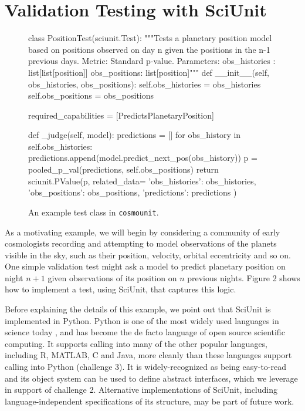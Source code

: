 \documentclass[9pt]{sig-alternate}
\begin{document}
\section{Validation Testing with {SciUnit}}
\begin{figure}[t]
\small
\begin{python}
class PositionTest(sciunit.Test):
    """Tests a planetary position model based on positions observed on day n given the positions in the n-1 previous days.
    Metric: Standard p-value.
    Parameters: 
      obs_histories : list[list[position]]
      obs_positions: list[position]"""
	def __init__(self, obs_histories, obs_positions):
		self.obs_histories = obs_histories
		self.obs_positions = obs_positions

	required_capabilities = [PredictsPlanetaryPosition]

	def _judge(self, model):
		predictions = []
		for obs_history in self.obs_histories:
			predictions.append(model.predict_next_pos(obs_history))
		p = pooled_p_val(predictions, self.obs_positions)
		return sciunit.PValue(p, related_data={
			'obs_histories': obs_histories,
			'obs_positions': obs_positions,
			'predictions': predictions
		})
\end{python}
\vspace{-5px}
\caption{An example test class in \texttt{cosmounit}.}
\label{fig:rate_test}
\vspace{-15px}
\end{figure}

As a motivating example, we will begin by considering a community of early cosmologists recording and attempting to model observations of the planets visible in the sky, such as their position, velocity, orbital eccentricity and so on. One simple validation test might ask a model to predict planetary position on night $n+1$ given observations of its position on $n$ previous nights. Figure 2 shows how to implement a test, using  SciUnit, that captures this logic.

Before explaining the details of this example, we point out that SciUnit is implemented in Python. Python is one of the most widely used languages in science today \cite{sanner1999python}, and has become the de facto language of open source scientific computing. It supports calling into  many of the other popular languages, including R, MATLAB, C and Java, more cleanly than these languages support calling into Python (challenge 3). It is widely-recognized as being easy-to-read and its object system can be used to define abstract interfaces, which we leverage in support of challenge 2. Alternative implementations of SciUnit, including language-independent specifications of its structure, may be part of future work.  
\end{document}
